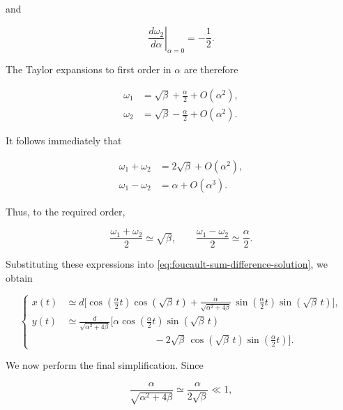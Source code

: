 \documentclass[12pt]{article}
\begin{document}
and

\[
  \left.
  \frac{d\omega_2}{d\alpha}
  \right|_{\alpha=0}
  =
  -\frac{1}{2}.
\]

The Taylor expansions to first order in \(\alpha\) are therefore

\begin{align}
  \omega_1
  &=
  \sqrt{\beta}
  +
  \frac{\alpha}{2}
  +
  O(\alpha^2),
  \\
  \omega_2
  &=
  \sqrt{\beta}
  -
  \frac{\alpha}{2}
  +
  O(\alpha^2).
\end{align}

It follows immediately that

\begin{align}
  \omega_1+\omega_2
  &=
  2\sqrt{\beta}
  +
  O(\alpha^2),
  \\
  \omega_1-\omega_2
  &=
  \alpha
  +
  O(\alpha^3).
\end{align}

Thus, to the required order,

\[
  \frac{\omega_1+\omega_2}{2}
  \simeq
  \sqrt{\beta},
  \qquad
  \frac{\omega_1-\omega_2}{2}
  \simeq
  \frac{\alpha}{2}.
\]

Substituting these expressions into
\eqref{eq:foucault-sum-difference-solution}, we obtain

\begin{equation}
  \left\{
  \begin{aligned}
    x(t)
    &\simeq
    d
    \Biggl[
      \cos\left(\frac{\alpha}{2}t\right)
      \cos\left(\sqrt{\beta}\,t\right)
      +
      \frac{\alpha}{\sqrt{\alpha^2+4\beta}}\,
      \sin\left(\frac{\alpha}{2}t\right)
      \sin\left(\sqrt{\beta}\,t\right)
    \Biggr],
    \\[0.8em]
    y(t)
    &\simeq
    \frac{d}{\sqrt{\alpha^2+4\beta}}
    \Biggl[
      \alpha
      \cos\left(\frac{\alpha}{2}t\right)
      \sin\left(\sqrt{\beta}\,t\right)
      \\
      &\hspace{9em}
      -
      2\sqrt{\beta}\,
      \cos\left(\sqrt{\beta}\,t\right)
      \sin\left(\frac{\alpha}{2}t\right)
    \Biggr].
  \end{aligned}
  \right.
  \label{eq:foucault-frequency-expanded-solution}
\end{equation}

We now perform the final simplification. Since

\[
  \frac{\alpha}{\sqrt{\alpha^2+4\beta}}
  \simeq
  \frac{\alpha}{2\sqrt{\beta}}
  \ll 1,
\]
\end{document}
